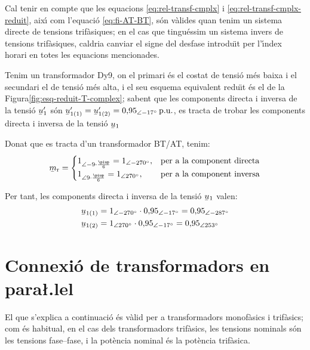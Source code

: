 Cal tenir en compte que les equacions \eqref{eq:rel-transf-cmplx} i \eqref{eq:rel-transf-cmplx-reduit}, aix\'{\i} com l'equaci\'{o} \eqref{eq:fi-AT-BT}, s\'{o}n v\`{a}lides quan tenim un sistema directe de tensions trif\`{a}siques; en el cas que tingu\'{e}ssim un sistema invers de tensions trif\`{a}siques, caldria canviar el signe del desfase introdu\"{\i}t per l'\'{\i}ndex horari en totes les equacions mencionades.


\begin{exemple}
Tenim un transformador Dy9, on el primari \'{e}s el costat de tensi\'{o} m\'{e}s baixa  i el secundari el de tensi\'{o} m\'{e}s alta, i el seu esquema equivalent redu\"{\i}t \'{e}s el de la Figura\vref{fig:esq-reduit-T-complex}; sabent que les components directa i inversa de la tensi\'{o} $\cmplx{u}'_1$ s\'{o}n
$\cmplx{u}'_{1(1)}= \cmplx{u}'_{1(2)} = 0{,}95_{\angle -17\degree}\unit{p.u.}$, es tracta de trobar les components directa i inversa de la tensi\'{o} $\cmplx{u}_1$

    Donat que es tracta d'un transformador BT/AT, tenim:
    \[
    \cmplx{m}\ped{r} = \begin{cases}
      1_{\angle -9\cdot\frac{\piup}{6}} = 1_{\angle -270\degree}, & \text{per a la component directa}\\
      1_{\angle 9\cdot\frac{\piup}{6}} = 1_{\angle 270\degree}, & \text{per a la component inversa}
    \end{cases}
    \]

     Per tant, les components directa i inversa de la tensi\'{o}  $\cmplx{u}_1$ valen:
    \begin{align*}
    \cmplx{u}_{1(1)} &= 1_{\angle -270\degree}\cdot 0{,}95_{\angle -17\degree}  = 0{,}95_{\angle -287\degree} \\
    \cmplx{u}_{1(2)} &= 1_{\angle  270\degree}\cdot 0{,}95_{\angle -17\degree}  = 0{,}95_{\angle 253\degree}
    \end{align*}
\end{exemple}



\section{\texorpdfstring{Connexi\'{o} de transformadors en para{\l.l}el}{Connexi\'{o} de transformadors en paral-lel}}

El que s'explica a continuaci\'{o} \'{e}s v\`{a}lid per a transformadors
monof\`{a}sics i trif\`{a}sics; com \'{e}s habitual, en el cas dels
transformadors trif\`{a}sics, les tensions nominals s\'{o}n les tensions
fase--fase, i la pot\`{e}ncia nominal \'{e}s la pot\`{e}ncia trif\`{a}sica.

